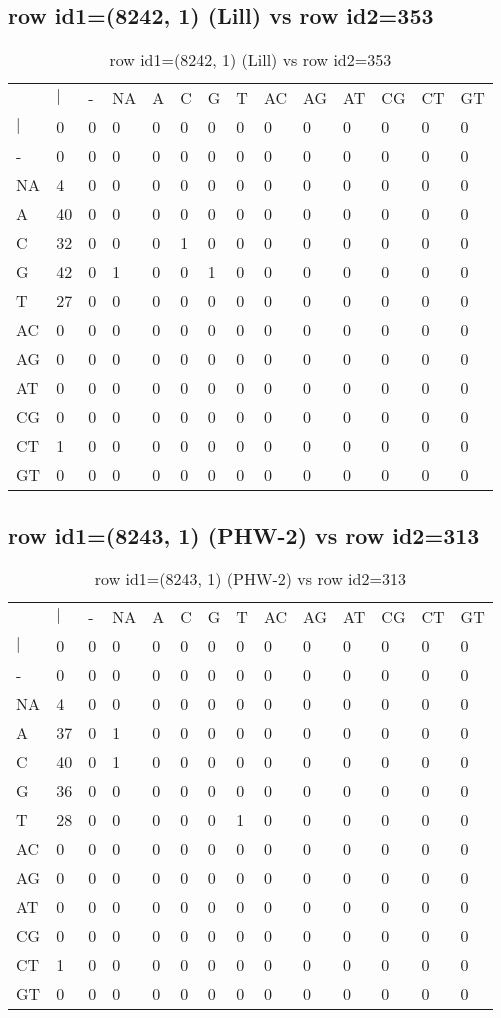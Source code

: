 \subsection{row id1=(8242, 1) (Lill) vs row id2=353}
\begin{center}
\begin{longtable}{|l|l|l|l|l|l|l|l|l|l|l|l|l|l|}
\caption{row id1=(8242, 1) (Lill) vs row id2=353} \label{table_dm370}\\
\hline
\\
\hline
&$|$&-&NA&A&C&G&T&AC&AG&AT&CG&CT&GT\\
$|$&0&0&0&0&0&0&0&0&0&0&0&0&0\\
-&0&0&0&0&0&0&0&0&0&0&0&0&0\\
NA&4&0&0&0&0&0&0&0&0&0&0&0&0\\
A&40&0&0&0&0&0&0&0&0&0&0&0&0\\
C&32&0&0&0&1&0&0&0&0&0&0&0&0\\
G&42&0&1&0&0&1&0&0&0&0&0&0&0\\
T&27&0&0&0&0&0&0&0&0&0&0&0&0\\
AC&0&0&0&0&0&0&0&0&0&0&0&0&0\\
AG&0&0&0&0&0&0&0&0&0&0&0&0&0\\
AT&0&0&0&0&0&0&0&0&0&0&0&0&0\\
CG&0&0&0&0&0&0&0&0&0&0&0&0&0\\
CT&1&0&0&0&0&0&0&0&0&0&0&0&0\\
GT&0&0&0&0&0&0&0&0&0&0&0&0&0\\
\hline
\end{longtable}
\end{center}

\subsection{row id1=(8243, 1) (PHW-2) vs row id2=313}
\begin{center}
\begin{longtable}{|l|l|l|l|l|l|l|l|l|l|l|l|l|l|}
\caption{row id1=(8243, 1) (PHW-2) vs row id2=313} \label{table_dm372}\\
\hline
\\
\hline
&$|$&-&NA&A&C&G&T&AC&AG&AT&CG&CT&GT\\
$|$&0&0&0&0&0&0&0&0&0&0&0&0&0\\
-&0&0&0&0&0&0&0&0&0&0&0&0&0\\
NA&4&0&0&0&0&0&0&0&0&0&0&0&0\\
A&37&0&1&0&0&0&0&0&0&0&0&0&0\\
C&40&0&1&0&0&0&0&0&0&0&0&0&0\\
G&36&0&0&0&0&0&0&0&0&0&0&0&0\\
T&28&0&0&0&0&0&1&0&0&0&0&0&0\\
AC&0&0&0&0&0&0&0&0&0&0&0&0&0\\
AG&0&0&0&0&0&0&0&0&0&0&0&0&0\\
AT&0&0&0&0&0&0&0&0&0&0&0&0&0\\
CG&0&0&0&0&0&0&0&0&0&0&0&0&0\\
CT&1&0&0&0&0&0&0&0&0&0&0&0&0\\
GT&0&0&0&0&0&0&0&0&0&0&0&0&0\\
\hline
\end{longtable}
\end{center}

